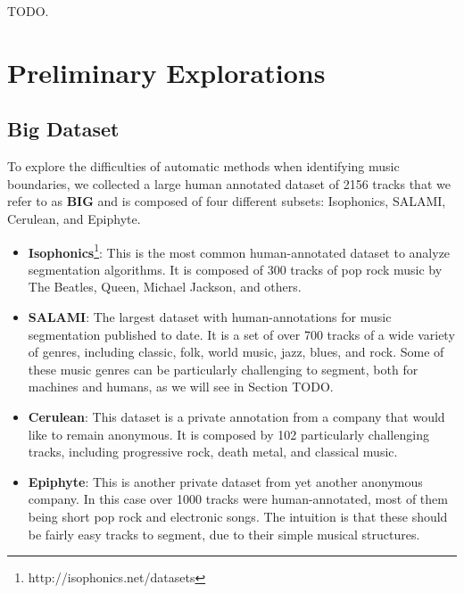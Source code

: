 \documentclass{article}
\begin{document}
TODO.




\section{Preliminary Explorations}\label{sec:prelExp}

\subsection{Big Dataset}

To explore the difficulties of automatic methods when identifying music boundaries, we collected a large human annotated dataset of 2156 tracks that we refer to as \textbf{BIG} and is composed of four different subsets: Isophonics, SALAMI, Cerulean, and Epiphyte.

\begin{itemize}
  \item
    \textbf{Isophonics}\footnote{http://isophonics.net/datasets}: This is the most common human-annotated dataset to analyze segmentation algorithms. 
    It is composed of 300 tracks of pop rock music by The Beatles, Queen, Michael Jackson, and others.

  \item
    \textbf{SALAMI}\cite{Smith2011}: The largest dataset with human-annotations for music segmentation published to date. 
    It is a set of over 700 tracks of a wide variety of genres, including classic, folk, world music, jazz, blues, and rock.
    Some of these music genres can be particularly challenging to segment, both for machines and humans, as we will see in Section TODO. %

  \item
    \textbf{Cerulean}: This dataset is a private annotation from a company that would like to remain anonymous.
    It is composed by 102 particularly challenging tracks, including progressive rock, death metal, and classical music.

  \item
    \textbf{Epiphyte}: This is another private dataset from yet another anonymous company.
    In this case over 1000 tracks were human-annotated, most of them being short pop rock and electronic songs.
    The intuition is that these should be fairly easy tracks to segment, due to their simple musical structures.

\end{itemize}
\end{document}
